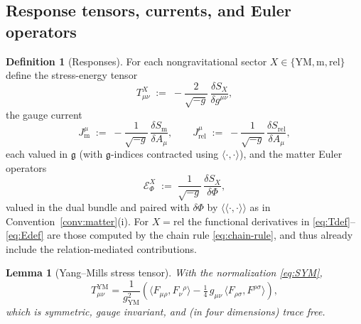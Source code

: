 \documentclass[11pt,a4paper]{article}
\theoremstyle{plain}
\newtheorem{lemma}[theorem]{Lemma}
\theoremstyle{definition}
\newtheorem{definition}[theorem]{Definition}
\theoremstyle{remark}
\newcommand{\gfrak}{\mathfrak{g}}
\begin{document}
\subsection{Response tensors, currents, and Euler operators}

\begin{definition}[Responses]
\label{def:responses}
For each nongravitational sector $X\in\{\mathrm{YM},\mathrm{m},\mathrm{rel}\}$ define the
stress-energy tensor
\begin{equation}
\label{eq:Tdef}
T^{X}_{\mu\nu}
\;:=\;
-\frac{2}{\sqrt{-g}}\,\frac{\delta S_X}{\delta g^{\mu\nu}} ,
\end{equation}
the gauge current
\begin{equation}
\label{eq:Jdef}
J^{\mu}_{\mathrm{m}}
\;:=\;
-\frac{1}{\sqrt{-g}}\,\frac{\delta S_{\mathrm{m}}}{\delta A_\mu},
\qquad
J^{\mu}_{\mathrm{rel}}
\;:=\;
-\frac{1}{\sqrt{-g}}\,\frac{\delta S_{\mathrm{rel}}}{\delta A_\mu},
\end{equation}
each valued in $\gfrak$ (with $\gfrak$-indices contracted using $\langle\cdot,\cdot\rangle$), and the
matter Euler operators
\begin{equation}
\label{eq:Edef}
\mathcal{E}^{X}_{\Phi}
\;:=\;
\frac{1}{\sqrt{-g}}\,\frac{\delta S_X}{\delta\Phi} ,
\end{equation}
valued in the dual bundle and paired with $\delta\Phi$ by
$\langle\!\langle\cdot,\cdot\rangle\!\rangle$ as in Convention~\ref{conv:matter}(i). For
$X=\mathrm{rel}$ the functional derivatives in \eqref{eq:Tdef}--\eqref{eq:Edef} are those computed by
the chain rule \eqref{eq:chain-rule}, and thus already include the relation-mediated contributions.
\end{definition}

\begin{lemma}[Yang--Mills stress tensor]
\label{lem:TYM}
With the normalization \eqref{eq:SYM},
\begin{equation}
\label{eq:TYM}
T^{\mathrm{YM}}_{\mu\nu}
=\frac{1}{g_{\mathrm{YM}}^{2}}
\left(
\bigl\langle F_{\mu\rho},F_{\nu}{}^{\rho}\bigr\rangle
-\tfrac14\,g_{\mu\nu}\,\bigl\langle F_{\rho\sigma},F^{\rho\sigma}\bigr\rangle
\right),
\end{equation}
which is symmetric, gauge invariant, and (in four dimensions) trace free.
\end{lemma}
\end{document}
